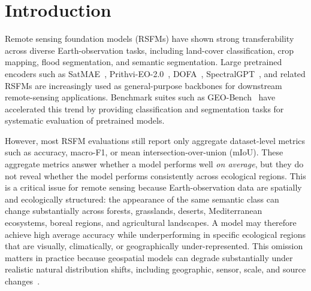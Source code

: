 \documentclass[10pt,twocolumn,letterpaper]{article}
\begin{document}



\section{Introduction}

Remote sensing foundation models (RSFMs) have shown strong transferability across diverse Earth-observation tasks, including land-cover classification, crop mapping, flood segmentation, and semantic segmentation. Large pretrained encoders such as SatMAE~\cite{satmae}, Prithvi-EO-2.0~\cite{prithvi2}, DOFA~\cite{dofa}, SpectralGPT~\cite{spectralgpt}, and related RSFMs are increasingly used as general-purpose backbones for downstream remote-sensing applications. Benchmark suites such as GEO-Bench~\cite{geobench} have accelerated this trend by providing classification and segmentation tasks for systematic evaluation of pretrained models.

However, most RSFM evaluations still report only aggregate dataset-level metrics such as accuracy, macro-F1, or mean intersection-over-union (mIoU). These aggregate metrics answer whether a model performs well \emph{on average}, but they do not reveal whether the model performs consistently across ecological regions. This is a critical issue for remote sensing because Earth-observation data are spatially and ecologically structured: the appearance of the same semantic class can change substantially across forests, grasslands, deserts, Mediterranean ecosystems, boreal regions, and agricultural landscapes. A model may therefore achieve high average accuracy while underperforming in specific ecological regions that are visually, climatically, or geographically under-represented. This omission matters in practice because geospatial models can degrade substantially under realistic natural distribution shifts, including geographic, sensor, scale, and source changes~\cite{rolf2023evaluation,earthshift2026}.
\end{document}
